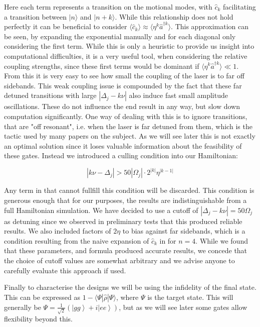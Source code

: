 \documentclass[12pt,twoside]{report}
\begin{document}
Here each term represents a transition on the motional modes, with $\hat{c}_k$ facilitating a transition between $|n\rangle$ and $|n+k\rangle$. While this relationship does not hold perfectly it can be beneficial to consider $\langle\hat{c}_k\rangle\approx\langle\eta^k\hat{a}^{\dagger k}\rangle$. This approximation can be seen, by expanding the exponential manually and for each diagonal only considering the first term. While this is only a heuristic to provide us insight into computational difficulties, it is a very useful tool, when considering the relative coupling strengths, since these first terms would be dominant if $\langle\eta^k\hat{a}^{\dagger k}\rangle\ll 1$. From this it is very easy to see how small the coupling of the laser is to far off sidebands\cite{Charged_Particle_traps_Cooling}. This weak coupling issue is compounded by the fact that these far detuned transitions with large $|\Delta_j -k\nu|$ also induce fast small amplitude oscillations. These do not influence the end result in any way, but slow down computation significantly. One way of dealing with this is to ignore transitions, that are "off resonant", i.e. when the laser is far detuned from them, which is the tactic used by many papers on the subject\cite{Cardioid,MS_gate,Fast_MS,SC_Paper}. As we will see later this is not exactly an optimal solution since it loses valuable information about the feasibility of these gates. Instead we introduced a culling condition into our Hamiltonian:

\begin{equation}
	|k\nu-\Delta_j| > 50|\Omega_j|\cdot 2^{|k|}\eta^{|k-1|}
	\label{eq:culling}
\end{equation}

Any term in  that cannot fullfill this condition will be discarded. This condition is generous enough that for our purposes, the results are indistinguishable from a full Hamiltonian simulation. We have decided to use a cutoff of $|\Delta_j -k\nu| = 50\Omega_j$ as detuning since we observed in preliminary  tests that this produced reliable results. We also included factors of $2\eta$ to bias against far sidebands, which is a condition resulting from the naive expansion of $\hat{c}_k$ in  for $n=4$. While we found that these parameters, and formula produced accurate results, we concede that the choice of cutoff values are somewhat arbitrary and we advise anyone to carefully evaluate this approach if used.

Finally to characterise the designs we will be using the infidelity of the final state. This can be expressed as $1-\langle\Psi|\hat{\rho}|\Psi\rangle$, where $\Psi$ is the target state. This will generally be $\Psi = \frac{1}{\sqrt{2}}\left(\left|gg\right\rangle + i\left|ee\right\rangle\right)$, but as we will see later some gates allow flexibility beyond this.
\end{document}
